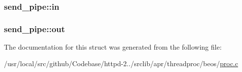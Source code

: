 \subsubsection[{\texorpdfstring{in}{in}}]{ send\+\_\+pipe\+::in}\hypertarget{structsend__pipe_ad04caf8393a3dcf84838cae162d222a0}{}\label{structsend__pipe_ad04caf8393a3dcf84838cae162d222a0}
\subsubsection[{\texorpdfstring{out}{out}}]{ send\+\_\+pipe\+::out}\hypertarget{structsend__pipe_ad15364f71a171d67455512b7219e6e92}{}\label{structsend__pipe_ad15364f71a171d67455512b7219e6e92}


The documentation for this struct was generated from the following file\+:\begin{DoxyCompactItemize}
\item 
/usr/local/src/github/\+Codebase/httpd-\/2../srclib/apr/threadproc/beos/\hyperlink{beos_2proc_8c}{proc.\+c}\end{DoxyCompactItemize}
